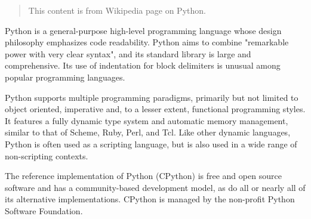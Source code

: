 \documentclass{article}
\begin{document}
\begin{abstract}
  This content is from Wikipedia page on Python. 
\end{abstract}
Python is a general-purpose high-level programming language whose
design philosophy emphasizes code readability. Python aims to combine
"remarkable power with very clear syntax", and its standard library is
large and comprehensive. Its use of indentation for block delimiters
is unusual among popular programming languages.

Python supports multiple programming paradigms, primarily but not
limited to object oriented, imperative and, to a lesser extent,
functional programming styles. It features a fully dynamic type system
and automatic memory management, similar to that of Scheme, Ruby,
Perl, and Tcl. Like other dynamic languages, Python is often used as a
scripting language, but is also used in a wide range of non-scripting
contexts. 

The reference implementation of Python (CPython) is free and open
source software and has a community-based development model, as do all
or nearly all of its alternative implementations. CPython is managed
by the non-profit Python Software Foundation.
\end{document}
